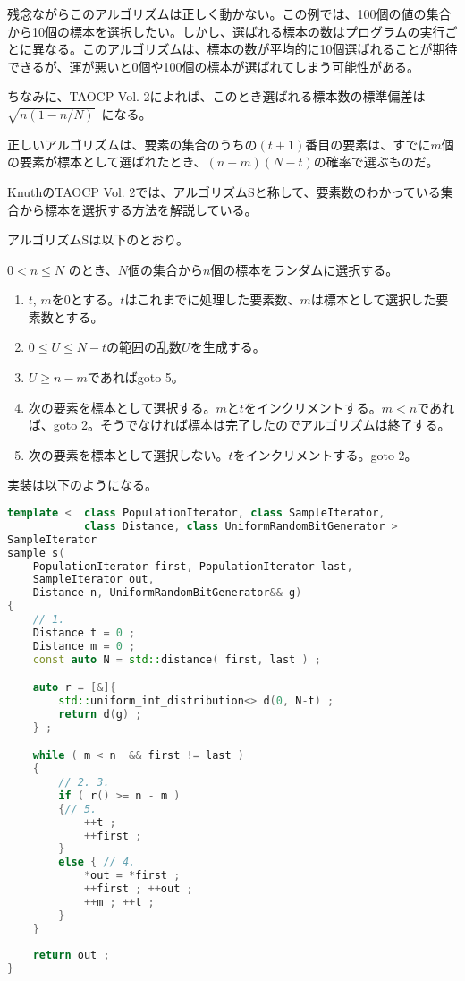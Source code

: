 残念ながらこのアルゴリズムは正しく動かない。この例では、100個の値の集合から10個の標本を選択したい。しかし、選ばれる標本の数はプログラムの実行ごとに異なる。このアルゴリズムは、標本の数が平均的に10個選ばれることが期待できるが、運が悪いと0個や100個の標本が選ばれてしまう可能性がある。

ちなみに、TAOCP Vol. 2によれば、このとき選ばれる標本数の標準偏差は~\(\sqrt{n(1-n/N)}\)~になる。

正しいアルゴリズムは、要素の集合のうちの\((t+1)\)番目の要素は、すでに\(m\)個の要素が標本として選ばれたとき、\((n-m)(N-t)\)の確率で選ぶものだ。

%

KnuthのTAOCP Vol. 2では、アルゴリズムSと称して、要素数のわかっている集合から標本を選択する方法を解説している。

アルゴリズムSは以下のとおり。

\(0 < n \leq N\)
のとき、\(N\)個の集合から\(n\)個の標本をランダムに選択する。

\begin{enumerate}
\def\labelenumi{\arabic{enumi}.}
\itemsep1pt\parskip0pt
\item
  \(t\),
  \(m\)を0とする。\(t\)はこれまでに処理した要素数、\(m\)は標本として選択した要素数とする。
\item
  \(0 \leq U \leq N - t\)の範囲の乱数\(U\)を生成する。
\item
  \(U \geq n - m\)であればgoto 5。
\item
  次の要素を標本として選択する。\(m\)と\(t\)をインクリメントする。\(m < n\)であれば、goto
  2。そうでなければ標本は完了したのでアルゴリズムは終了する。
\item
  次の要素を標本として選択しない。\(t\)をインクリメントする。goto 2。
\end{enumerate}

実装は以下のようになる。

\begin{lstlisting}[language=C++]
template <  class PopulationIterator, class SampleIterator,
            class Distance, class UniformRandomBitGenerator >
SampleIterator
sample_s(
    PopulationIterator first, PopulationIterator last,
    SampleIterator out,
    Distance n, UniformRandomBitGenerator&& g)
{
    // 1.
    Distance t = 0 ;
    Distance m = 0 ;
    const auto N = std::distance( first, last ) ;

    auto r = [&]{
        std::uniform_int_distribution<> d(0, N-t) ;
        return d(g) ;
    } ;

    while ( m < n  && first != last )
    {
        // 2. 3.
        if ( r() >= n - m )
        {// 5.
            ++t ;
            ++first ;
        }
        else { // 4.
            *out = *first ;
            ++first ; ++out ;
            ++m ; ++t ;
        }
    }
    
    return out ;
}
\end{lstlisting}

